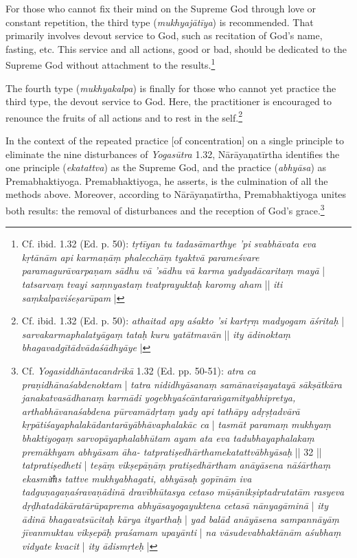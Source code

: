 For those who cannot fix their mind on the Supreme God through love or constant repetition, the third type (\textit{mukhyajātīya}) is recommended. That primarily involves devout service to God, such as recitation of God's name, fasting, etc. This service and all actions, good or bad, should be dedicated to the Supreme God without attachment to the results.\footnote{Cf. ibid. 1.32 (Ed. p. 50): \textit{tṛtīyan tu tadasāmarthye 'pi svabhāvata eva kṛtānām api karmaṇāṃ phalecchāṃ tyaktvā parameśvare paramagurāvarpaṇam sādhu vā 'sādhu vā karma yadyadācaritaṃ mayā} | \textit{tatsarvaṃ tvayi saṃnyastaṃ tvatprayuktaḥ karomy aham} || \textit{iti saṃkalpaviśeṣarūpam} |}

The fourth type (\textit{mukhyakalpa}) is finally for those who cannot yet practice the third type, the devout service to God. Here, the practitioner is encouraged to renounce the fruits of all actions and to rest in the self.\footnote{Cf. ibid. 1.32 (Ed. p. 50): \textit{athaitad apy aśakto 'si kartṛṃ madyogam āśritaḥ} | \textit{sarvakarmaphalatyāgaṃ tataḥ kuru yatātmavān} || \textit{ity ādinoktaṃ bhagavadgītādvādaśādhyāye} |}

In the context of the repeated practice [of concentration] on a single principle to eliminate the nine disturbances of \textit{Yogasūtra} 1.32, Nārāyaṇatīrtha identifies the one principle (\textit{ekatattva}) as the Supreme God, and the practice (\textit{abhyāsa}) as Premabhaktiyoga. Premabhaktiyoga, he asserts, is the culmination of all the methods above. Moreover, according to Nārāyaṇatīrtha, Premabhaktiyoga unites both results: the removal of disturbances and the reception of God's grace.\footnote{Cf. \textit{Yogasiddhāntacandrikā} 1.32 (Ed. pp. 50-51): \textit{atra ca praṇidhānaśabdenoktam} | \textit{tatra nididhyāsanaṃ samānaviṣayatayā sākṣātkāra janakatvasādhanaṃ karmādi yogebhyaścāntaraṅgamityabhipretya, arthabhāvanaśabdena pūrvamādṛtaṃ yady api tathāpy adṛṣṭadvārā kṛpātiśayaphalakādantarāyābhāvaphalakāc ca }| \textit{tasmāt paramaṃ mukhyaṃ bhaktiyogaṃ sarvopāyaphalabhūtam ayam ata eva tadubhayaphalakaṃ premākhyam abhyāsam āha- tatpratiṣedhārthamekatattvābhyāsaḥ} || 32 || \textit{tatpratiṣedheti} | \textit{teṣāṃ vikṣepāṇāṃ pratiṣedhārtham anāyāsena nāśārthaṃ ekasmim̐s tattve mukhyabhagati, abhyāsaḥ gopīnām iva tadguṇagaṇaśravaṇādinā dravībhūtasya cetaso mūṣānikṣiptadrutatām rasyeva dṛḍhatadākāratārūpaprema abhyāsayogayuktena cetasā nānyagāminā} | \textit{ity ādinā bhagavatsūcitaḥ kārya ityarthaḥ} | \textit{yad balād anāyāsena sampannāyāṃ jīvanmuktau vikṣepāḥ praśamam upayānti} | \textit{na vāsudevabhaktānām aśubhaṃ vidyate kvacit} | \textit{ity ādismṛteḥ} |}

